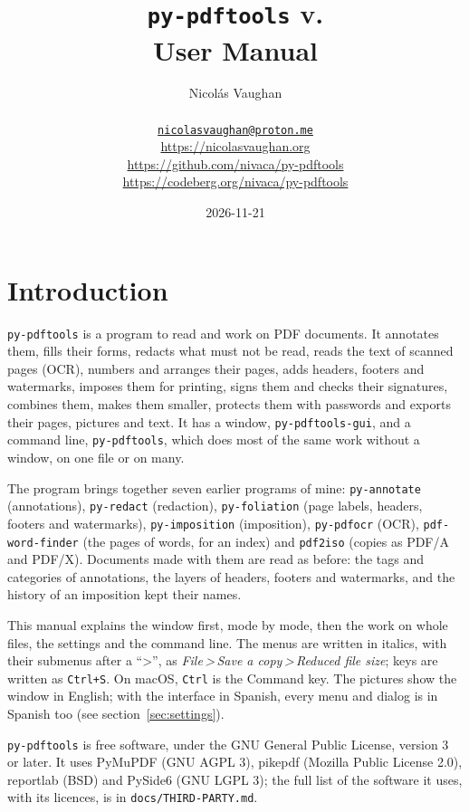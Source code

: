 \documentclass[12pt,
              article,
              oneside
              ]{memoir}
\title{\bfseries%
  \texttt{py-pdftools} v.\version{} \\
  User Manual}
\author{%
  Nicolás Vaughan\\
  \begin{minipage}[t]{0.8\linewidth}
    \centering\small%
    \href{mailto:nicolasvaughan@proton.me}{\texttt{nicolasvaughan@proton.me}}\\
    \url{https://nicolasvaughan.org}\\
    \url{https://github.com/nivaca/py-pdftools}\\
    \url{https://codeberg.org/nivaca/py-pdftools}\\
  \end{minipage}}
\date{2026-11-21}
\newcommand*{\menu}[1]{\textit{#1}}
\newcommand*{\then}{\,>\,}
\newcommand*{\key}[1]{\texttt{#1}}
\begin{document}
\maketitle

\tableofcontents*

\section{Introduction}
\noindent
\texttt{py-pdftools} is a program to read and work on PDF documents. It
annotates them, fills their forms, redacts what must not be read, reads the
text of scanned pages (OCR), numbers and arranges their pages, adds headers,
footers and watermarks, imposes them for printing, signs them and checks
their signatures, combines them, makes them smaller, protects them with
passwords and exports their pages, pictures and text. It has a window,
\texttt{py-pdftools-gui}, and a command line, \texttt{py-pdftools}, which
does most of the same work without a window, on one file or on many.

%
The program brings together seven earlier programs of mine:
\texttt{py-annotate} (annotations), \texttt{py-redact} (redaction),
\texttt{py-foliation} (page labels, headers, footers and watermarks),
\texttt{py-imposition} (imposition), \texttt{py-pdfocr} (OCR),
\texttt{pdf-word-finder} (the pages of words, for an index) and
\texttt{pdf2iso} (copies as PDF/A and PDF/X). Documents made with them are
read as before: the tags and categories of annotations, the layers of
headers, footers and watermarks, and the history of an imposition kept
their names.

%
This manual explains the window first, mode by mode, then the work on
whole files, the settings and the command line. The menus are written in
italics, with their submenus after a \enquote{>}, as \menu{File\then Save a
copy\then Reduced file size}; keys are written as \key{Ctrl+S}. On macOS, \key{Ctrl}
is the Command key. The pictures show the window in English; with the
interface in Spanish, every menu and dialog is in Spanish too (see
section~\ref{sec:settings}).

%
\texttt{py-pdftools} is free software, under the GNU General Public
License, version 3 or later. It uses PyMuPDF (GNU AGPL 3), pikepdf (Mozilla
Public License 2.0), reportlab (BSD) and PySide6 (GNU LGPL 3); the full list
of the software it uses, with its licences, is in
\texttt{docs/THIRD-PARTY.md}.
\end{document}
